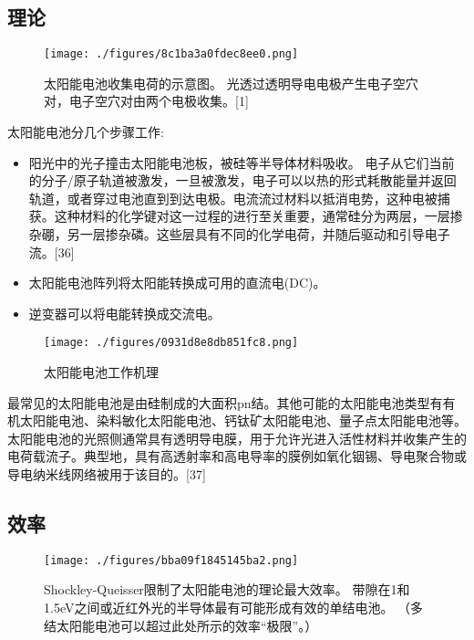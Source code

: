\subsection{理论}

\begin{figure}[ht]
\centering
\texttt{[image: ./figures/8c1ba3a0fdec8ee0.png]}
\caption{太阳能电池收集电荷的示意图。 光透过透明导电电极产生电子空穴对，电子空穴对由两个电极收集。[1]} \label{fig_TYNDC_10}
\end{figure}

太阳能电池分几个步骤工作:

\begin{itemize}
\item 阳光中的光子撞击太阳能电池板，被硅等半导体材料吸收。
电子从它们当前的分子/原子轨道被激发，一旦被激发，电子可以以热的形式耗散能量并返回轨道，或者穿过电池直到到达电极。电流流过材料以抵消电势，这种电被捕获。这种材料的化学键对这一过程的进行至关重要，通常硅分为两层，一层掺杂硼，另一层掺杂磷。这些层具有不同的化学电荷，并随后驱动和引导电子流。[36]
\item 太阳能电池阵列将太阳能转换成可用的直流电(DC)。
\item 逆变器可以将电能转换成交流电。
\end{itemize}

\begin{figure}[ht]
\centering
\texttt{[image: ./figures/0931d8e8db851fc8.png]}
\caption{太阳能电池工作机理} \label{fig_TYNDC_11}
\end{figure}

最常见的太阳能电池是由硅制成的大面积pn结。其他可能的太阳能电池类型有有机太阳能电池、染料敏化太阳能电池、钙钛矿太阳能电池、量子点太阳能电池等。太阳能电池的光照侧通常具有透明导电膜，用于允许光进入活性材料并收集产生的电荷载流子。典型地，具有高透射率和高电导率的膜例如氧化铟锡、导电聚合物或导电纳米线网络被用于该目的。[37]

\subsection{效率}

\begin{figure}[ht]
\centering
\texttt{[image: ./figures/bba09f1845145ba2.png]}
\caption{Shockley-Queisser限制了太阳能电池的理论最大效率。 带隙在1和1.5eV之间或近红外光的半导体最有可能形成有效的单结电池。 （多结太阳能电池可以超过此处所示的效率“极限”。）} \label{fig_TYNDC_9}
\end{figure}

